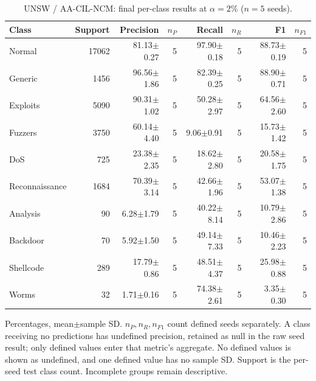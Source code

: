 \begin{table}[t]
\centering\scriptsize
\setlength{\tabcolsep}{3.3pt}
\caption{UNSW / AA-CIL-NCM: final per-class results at $\alpha=2\%$ ($n=5$ seeds).}\label{tab:forgetting-class-unsw_nb15-aacil-ncm}
\begin{tabular}{lrrrrrrr}
\toprule
Class & Support & Precision & $n_P$ & Recall & $n_R$ & F1 & $n_{F1}$ \\
\midrule
Normal & 17062 & 81.13$\pm$0.27 & 5 & 97.90$\pm$0.18 & 5 & 88.73$\pm$0.19 & 5 \\
Generic & 1456 & 96.56$\pm$1.86 & 5 & 82.39$\pm$0.25 & 5 & 88.90$\pm$0.71 & 5 \\
Exploits & 5090 & 90.31$\pm$1.02 & 5 & 50.28$\pm$2.97 & 5 & 64.56$\pm$2.60 & 5 \\
Fuzzers & 3750 & 60.14$\pm$4.40 & 5 & 9.06$\pm$0.91 & 5 & 15.73$\pm$1.42 & 5 \\
DoS & 725 & 23.38$\pm$2.35 & 5 & 18.62$\pm$2.80 & 5 & 20.58$\pm$1.75 & 5 \\
Reconnaissance & 1684 & 70.39$\pm$3.14 & 5 & 42.66$\pm$1.96 & 5 & 53.07$\pm$1.38 & 5 \\
Analysis & 90 & 6.28$\pm$1.79 & 5 & 40.22$\pm$8.14 & 5 & 10.79$\pm$2.86 & 5 \\
Backdoor & 70 & 5.92$\pm$1.50 & 5 & 49.14$\pm$7.33 & 5 & 10.46$\pm$2.23 & 5 \\
Shellcode & 289 & 17.79$\pm$0.86 & 5 & 48.51$\pm$4.37 & 5 & 25.98$\pm$0.88 & 5 \\
Worms & 32 & 1.71$\pm$0.16 & 5 & 74.38$\pm$2.61 & 5 & 3.35$\pm$0.30 & 5 \\
\bottomrule
\end{tabular}
\par\smallskip\begin{minipage}{0.98\textwidth}\scriptsize Percentages, mean$\pm$sample SD. $n_P,n_R,n_{F1}$ count defined seeds separately. A class receiving no predictions has undefined precision, retained as null in the raw seed result; only defined values enter that metric's aggregate. No defined values is shown as undefined, and one defined value has no sample SD. Support is the per-seed test class count. Incomplete groups remain descriptive.\end{minipage}
\end{table}


